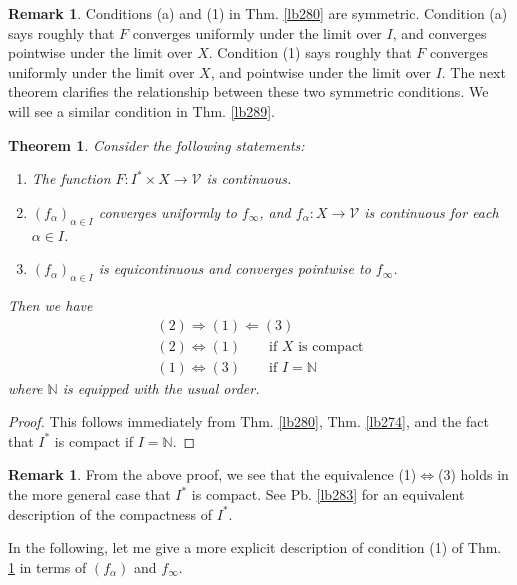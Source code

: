 \documentclass[12pt,b5paper,notitlepage]{article}
\theoremstyle{definition}
\newtheorem{rem}[df]{Remark}
\theoremstyle{plain}
\newtheorem{thm}[df]{Theorem}
\newcommand{\mc}{\mathcal}
\newcommand{\Nbb}{\mathbb N}
\numberwithin{equation}{section}
\begin{document}
\begin{rem}\label{lb340}
Conditions (a) and (1) in Thm. \ref{lb280} are symmetric. Condition (a) says roughly that $F$ converges uniformly under the limit over $I$, and converges pointwise under the limit over $X$. Condition (1) says roughly that $F$ converges uniformly under the limit over $X$, and pointwise under the limit over $I$. The next theorem clarifies the relationship between these two symmetric conditions. We will see a similar condition in Thm. \ref{lb289}.
\end{rem}



\begin{thm}\label{lb277}
Consider the following statements:
\begin{enumerate}
\item[(1)] The function $F:I^*\times X\rightarrow\mc V$ is continuous.
\item[(2)] $(f_\alpha)_{\alpha\in I}$ converges uniformly to $f_\infty$, and $f_\alpha:X\rightarrow\mc V$ is continuous for each $\alpha\in I$.
\item[(3)] $(f_\alpha)_{\alpha\in I}$ is equicontinuous and converges pointwise to $f_\infty$.
\end{enumerate}
Then we have
\begin{gather*}
(2)\Longrightarrow(1)\Longleftarrow (3)\\
(2)\Longleftrightarrow(1)\qquad \text{if $X$ is compact}\\
(1)\Longleftrightarrow (3) \qquad \text{if }I=\Nbb
\end{gather*}
where $\Nbb$ is equipped with the usual order.
\end{thm}






\begin{proof}
This follows immediately from Thm. \ref{lb280}, Thm. \ref{lb274}, and the fact that $I^*$ is compact if $I=\Nbb$. 
\end{proof}

\begin{rem}
From the above proof, we see that the equivalence (1)$\Leftrightarrow$(3) holds in the more general case that $I^*$ is compact. See Pb. \ref{lb283} for an equivalent description of the compactness of $I^*$.
\end{rem}


In the following, let me give a more explicit description of condition (1) of Thm. \ref{lb277} in terms of $(f_\alpha)$ and $f_\infty$. 
\end{document}
